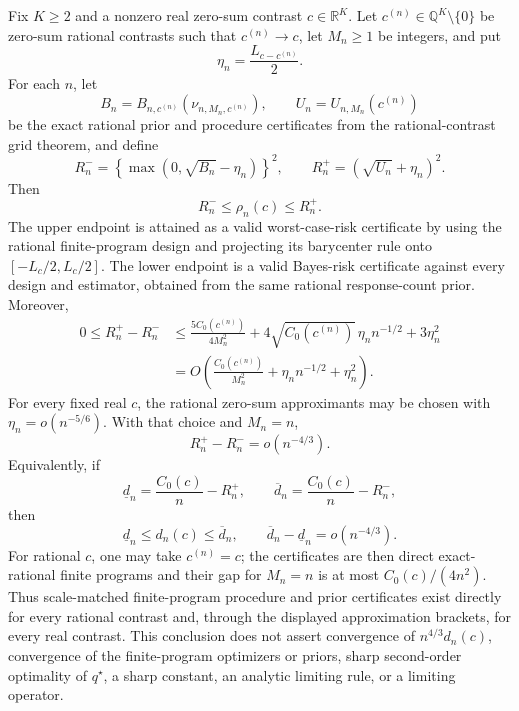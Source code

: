 Fix \(K\geq2\) and a nonzero real zero-sum contrast \(c\in\mathbb R^K\).  Let \(c^{(n)}\in\mathbb Q^K\setminus\{0\}\) be zero-sum rational contrasts such that \(c^{(n)}\to c\), let \(M_n\geq1\) be integers, and put
\[
 \eta_n=\frac{L_{c-c^{(n)}}}{2}.
\]
For each \(n\), let
\[
 B_n=B_{n,c^{(n)}}(\nu_{n,M_n,c^{(n)}}),
 \qquad
 U_n=U_{n,M_n}(c^{(n)})
\]
be the exact rational prior and procedure certificates from the rational-contrast grid theorem, and define
\[
 R_n^-=\left\{\max(0,\sqrt{B_n}-\eta_n)\right\}^2,
 \qquad
 R_n^+=(\sqrt{U_n}+\eta_n)^2.
\]
Then
\[
 R_n^-\leq\rho_n(c)\leq R_n^+.
\]
The upper endpoint is attained as a valid worst-case-risk certificate by using the rational finite-program design and projecting its barycenter rule onto \([-L_c/2,L_c/2]\).  The lower endpoint is a valid Bayes-risk certificate against every design and estimator, obtained from the same rational response-count prior.  Moreover,
\[
 \begin{aligned}
 0\leq R_n^+-R_n^-
 &\leq \frac{5C_0(c^{(n)})}{4M_n^2}
 +4\sqrt{C_0(c^{(n)})}\,\eta_n n^{-1/2}
 +3\eta_n^2\\
 &=O\!\left(\frac{C_0(c^{(n)})}{M_n^2}
 +\eta_n n^{-1/2}+\eta_n^2\right).
 \end{aligned}
\]
For every fixed real \(c\), the rational zero-sum approximants may be chosen with \(\eta_n=o(n^{-5/6})\).  With that choice and \(M_n=n\),
\[
 R_n^+-R_n^-=o(n^{-4/3}).
\]
Equivalently, if
\[
 \underline d_n=\frac{C_0(c)}n-R_n^+,
 \qquad
 \overline d_n=\frac{C_0(c)}n-R_n^-,
\]
then
\[
 \underline d_n\leq d_n(c)\leq\overline d_n,
 \qquad
 \overline d_n-\underline d_n=o(n^{-4/3}).
\]
For rational \(c\), one may take \(c^{(n)}=c\); the certificates are then direct exact-rational finite programs and their gap for \(M_n=n\) is at most \(C_0(c)/(4n^2)\).  Thus scale-matched finite-program procedure and prior certificates exist directly for every rational contrast and, through the displayed approximation brackets, for every real contrast.  This conclusion does not assert convergence of \(n^{4/3}d_n(c)\), convergence of the finite-program optimizers or priors, sharp second-order optimality of \(q^\star\), a sharp constant, an analytic limiting rule, or a limiting operator.